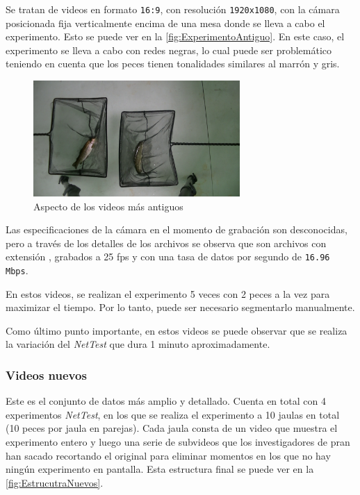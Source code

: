 Se tratan de videos en formato \texttt{16:9}, con resolución \texttt{1920x1080}, con la cámara posicionada fija verticalmente encima de una mesa donde se lleva a cabo el experimento. Esto se puede ver 
en la \autoref{fig:ExperimentoAntiguo}. En este caso, el experimento se lleva a cabo con redes negras, lo cual puede ser problemático teniendo en cuenta que los peces tienen 
tonalidades similares al marrón y gris.

\begin{figure}[h]
    \centering
    \includegraphics[width=0.70\textwidth]{images/3/ExperimentoAntiguo.png}
    \caption{Aspecto de los videos más antiguos}
    \label{fig:ExperimentoAntiguo}
\end{figure}

Las especificaciones de la cámara en el momento de grabación son desconocidas, pero a través de los detalles de los archivos se observa que son archivos con extensión 
\texttt{}, grabados a 25 \acrshort{fps} y con una tasa de datos por segundo de \texttt{16.96 Mbps}.

En estos videos, se realizan el experimento 5 veces con 2 peces a la vez para maximizar el tiempo. Por lo tanto, puede ser necesario segmentarlo manualmente.

Como último punto importante, en estos videos se puede observar que se realiza la variación del \textit{NetTest} que dura 1 minuto aproximadamente.

\subsubsection*{Videos nuevos}

Este es el conjunto de datos más amplio y detallado. Cuenta en total con 4 experimentos \textit{NetTest}, en los que se realiza el experimento a 10 jaulas en total (10 peces por jaula en parejas). 
Cada jaula consta de un  video que muestra el experimento entero y luego una serie de subvideos que los investigadores de \acrshort{pran} han sacado recortando el original para eliminar 
momentos en los que no hay ningún experimento en pantalla. Esta estructura final se puede ver en la \autoref{fig:EstrucutraNuevos}.

